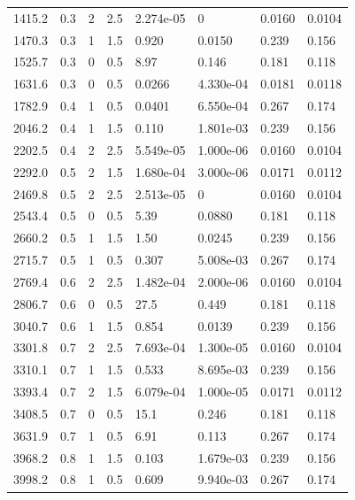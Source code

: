 \documentclass[preview]{standalone}
\begin{document}
{{\begin{tabular}{L{1.2cm}C{1.2cm} C{0.3cm}C{0.5cm} C{1.4cm}C{1.4cm} C{1.4cm}C{1.4cm}}
  1415.2  &   0.3  & 2     & 2.5 &  2.274e-05  & 0  & 0.0160 &  0.0104   \\ 
  1470.3  &   0.3  & 1     & 1.5 &  0.920  & 0.0150  & 0.239 &  0.156   \\ 
  1525.7  &   0.3  & 0     & 0.5 &  8.97  & 0.146  & 0.181 &  0.118   \\ 
  1631.6  &   0.3  & 0     & 0.5 &  0.0266  & 4.330e-04  & 0.0181 &  0.0118   \\ 
  1782.9  &   0.4  & 1     & 0.5 &  0.0401  & 6.550e-04  & 0.267 &  0.174   \\ 
  2046.2  &   0.4  & 1     & 1.5 &  0.110  & 1.801e-03  & 0.239 &  0.156   \\ 
  2202.5  &   0.4  & 2     & 2.5 &  5.549e-05  & 1.000e-06  & 0.0160 &  0.0104   \\ 
  2292.0  &   0.5  & 2     & 1.5 &  1.680e-04  & 3.000e-06  & 0.0171 &  0.0112   \\ 
  2469.8  &   0.5  & 2     & 2.5 &  2.513e-05  & 0  & 0.0160 &  0.0104   \\ 
  2543.4  &   0.5  & 0     & 0.5 &  5.39  & 0.0880  & 0.181 &  0.118   \\ 
  2660.2  &   0.5  & 1     & 1.5 &  1.50  & 0.0245  & 0.239 &  0.156   \\ 
  2715.7  &   0.5  & 1     & 0.5 &  0.307  & 5.008e-03  & 0.267 &  0.174   \\ 
  2769.4  &   0.6  & 2     & 2.5 &  1.482e-04  & 2.000e-06  & 0.0160 &  0.0104   \\ 
  2806.7  &   0.6  & 0     & 0.5 &  27.5  & 0.449  & 0.181 &  0.118   \\ 
  3040.7  &   0.6  & 1     & 1.5 &  0.854  & 0.0139  & 0.239 &  0.156   \\ 
  3301.8  &   0.7  & 2     & 2.5 &  7.693e-04  & 1.300e-05  & 0.0160 &  0.0104   \\ 
  3310.1  &   0.7  & 1     & 1.5 &  0.533  & 8.695e-03  & 0.239 &  0.156   \\ 
  3393.4  &   0.7  & 2     & 1.5 &  6.079e-04  & 1.000e-05  & 0.0171 &  0.0112   \\ 
  3408.5  &   0.7  & 0     & 0.5 &  15.1  & 0.246  & 0.181 &  0.118   \\ 
  3631.9  &   0.7  & 1     & 0.5 &  6.91  & 0.113  & 0.267 &  0.174   \\ 
  3968.2  &   0.8  & 1     & 1.5 &  0.103  & 1.679e-03  & 0.239 &  0.156   \\ 
  3998.2  &   0.8  & 1     & 0.5 &  0.609  & 9.940e-03  & 0.267 &  0.174   \\ 

\end{tabular}}}
\end{document}

